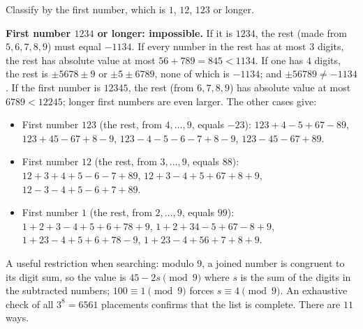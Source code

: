 Classify by the first number, which is $1$, $12$, $123$ or longer.

\textbf{First number $1234$ or longer: impossible.} If it is $1234$, the rest (made from $5,6,7,8,9$) must equal $-1134$. If every number in the rest has at most $3$ digits, the rest has absolute value at most $56+789=845<1134$. If one has $4$ digits, the rest is $\pm5678\pm9$ or $\pm5\pm6789$, none of which is $-1134$; and $\pm56789\ne-1134$. If the first number is $12345$, the rest (from $6,7,8,9$) has absolute value at most $6789<12245$; longer first numbers are even larger. The other cases give:
\begin{itemize}
\item First number $123$ (the rest, from $4,\dots,9$, equals $-23$): $123+4-5+67-89$, $123+45-67+8-9$, $123-4-5-6-7+8-9$, $123-45-67+89$.
\item First number $12$ (the rest, from $3,\dots,9$, equals $88$): $12+3+4+5-6-7+89$, $12+3-4+5+67+8+9$, $12-3-4+5-6+7+89$.
\item First number $1$ (the rest, from $2,\dots,9$, equals $99$): $1+2+3-4+5+6+78+9$, $1+2+34-5+67-8+9$, $1+23-4+5+6+78-9$, $1+23-4+56+7+8+9$.
\end{itemize}
A useful restriction when searching: modulo $9$, a joined number is congruent to its digit sum, so the value is $45-2s\pmod 9$ where $s$ is the sum of the digits in the subtracted numbers; $100\equiv1\pmod9$ forces $s\equiv4\pmod9$. An exhaustive check of all $3^8=6561$ placements confirms that the list is complete. There are $\boxed{11}$ ways.
